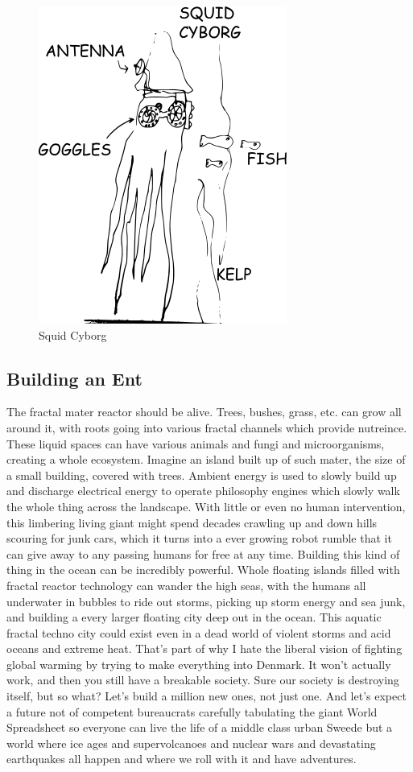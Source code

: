 \begin{figure}[htbp]
\centering
\includegraphics{images/squidcyborg.png}
\caption{Squid Cyborg}
\end{figure}

\subsection{Building an Ent}\label{building-an-ent}

The fractal mater reactor should be alive. Trees, bushes, grass, etc.
can grow all around it, with roots going into various fractal channels
which provide nutreince. These liquid spaces can have various animals
and fungi and microorganisms, creating a whole ecosystem. Imagine an
island built up of such mater, the size of a small building, covered
with trees. Ambient energy is used to slowly build up and discharge
electrical energy to operate philosophy engines which slowly walk the
whole thing across the landscape. With little or even no human
intervention, this limbering living giant might spend decades crawling
up and down hills scouring for junk cars, which it turns into a ever
growing robot rumble that it can give away to any passing humans for
free at any time. Building this kind of thing in the ocean can be
incredibly powerful. Whole floating islands filled with fractal reactor
technology can wander the high seas, with the humans all underwater in
bubbles to ride out storms, picking up storm energy and sea junk, and
building a every larger floating city deep out in the ocean. This
aquatic fractal techno city could exist even in a dead world of violent
storms and acid oceans and extreme heat. That's part of why I hate the
liberal vision of fighting global warming by trying to make everything
into Denmark. It won't actually work, and then you still have a
breakable society. Sure our society is destroying itself, but so what?
Let's build a million new ones, not just one. And let's expect a future
not of competent bureaucrats carefully tabulating the giant World
Spreadsheet so everyone can live the life of a middle class urban Sweede
but a world where ice ages and supervolcanoes and nuclear wars and
devastating earthquakes all happen and where we roll with it and have
adventures.

